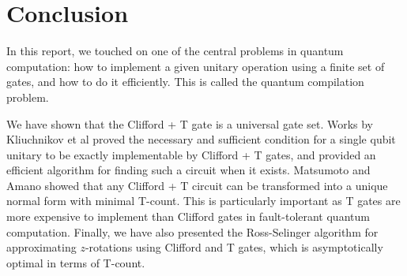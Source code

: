 \section{Conclusion}

In this report, we touched on one of the central problems in quantum computation: how to implement a given unitary operation using a finite set of gates, and how to do it efficiently. 
This is called the quantum compilation problem.

We have shown that the Clifford + T gate is a universal gate set.
Works by Kliuchnikov et al \cite{exact-clifford+t} proved the necessary and sufficient condition for a single qubit unitary to be exactly implementable by Clifford + T gates, and provided an efficient algorithm for finding such a circuit when it exists.
Matsumoto and Amano \cite{matsumoto} showed that any Clifford + T circuit can be transformed into a unique normal form with minimal T-count. 
This is particularly important as T gates are more expensive to implement than Clifford gates in fault-tolerant quantum computation.
Finally, we have also presented the Ross-Selinger algorithm for approximating $z$-rotations using Clifford and T gates, which is asymptotically optimal in terms of T-count.

